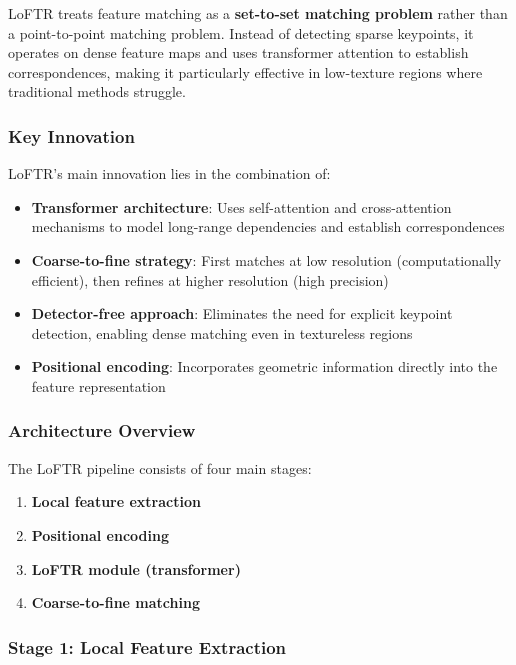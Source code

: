 \documentclass[11pt,a4paper]{article}
\theoremstyle{definition}
\theoremstyle{plain}
\theoremstyle{remark}
\begin{document}
\begin{tcolorbox}[colback=blue!5!white,colframe=blue!75!black,title=\textbf{LoFTR Core Concept}]
LoFTR treats feature matching as a \textbf{set-to-set matching problem} rather than a point-to-point matching problem. Instead of detecting sparse keypoints, it operates on dense feature maps and uses transformer attention to establish correspondences, making it particularly effective in low-texture regions where traditional methods struggle.
\end{tcolorbox}

\subsubsection{Key Innovation}

LoFTR's main innovation lies in the combination of:
\begin{itemize}
    \item \textbf{Transformer architecture}: Uses self-attention and cross-attention mechanisms to model long-range dependencies and establish correspondences
    \item \textbf{Coarse-to-fine strategy}: First matches at low resolution (computationally efficient), then refines at higher resolution (high precision)
    \item \textbf{Detector-free approach}: Eliminates the need for explicit keypoint detection, enabling dense matching even in textureless regions
    \item \textbf{Positional encoding}: Incorporates geometric information directly into the feature representation
\end{itemize}

\subsubsection{Architecture Overview}

The LoFTR pipeline consists of four main stages:

\begin{enumerate}
    \item \textbf{Local feature extraction}
    \item \textbf{Positional encoding}
    \item \textbf{LoFTR module (transformer)}
    \item \textbf{Coarse-to-fine matching}
\end{enumerate}

\subsubsection{Stage 1: Local Feature Extraction}
\end{document}

